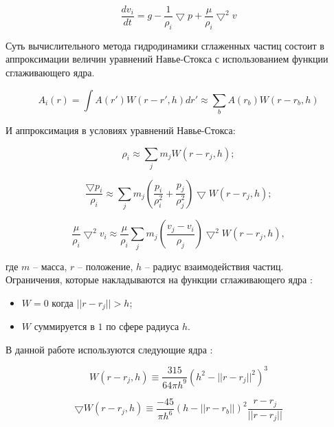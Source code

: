 \begin{equation}
\label{eq:}
\frac{dv_i}{dt} = g - \frac{1}{\rho_i}\bigtriangledown{}p + \frac{\mu}{\rho_i}\bigtriangledown^2v
\end{equation}

Суть вычислительного метода гидродинамики сглаженных частиц состоит в аппроксимации величин
уравнений Навье-Стокса с использованием функции сглаживающего ядра.

\begin{equation}
\label{eq:mon1992}
A_i(r) = \int{}A(r')W(r - r', h)dr' \approx \sum_{b}A(r_b)W(r - r_b, h)
\end{equation}

И аппроксимация в условиях уравнений Навье-Стокса:

\begin{equation}
\label{eq:}
  \rho_i \approx \sum_{j}m_jW(r - r_j, h);
\end{equation}

\begin{equation}
\label{eq:}
\frac{\bigtriangledown{}p_i}{\rho_i} \approx \sum_{j}m_j(\frac{p_i}{\rho_i^2} + \frac{p_j}{\rho_j^2})\bigtriangledown{}W(r - r_j, h);
\end{equation}

\begin{equation}
\label{eq:}
\frac{\mu}{\rho_i}\bigtriangledown^2v_i \approx \frac{\mu}{\rho_i}\sum_{j}m_j(\frac{v_j - v_i}{\rho_j})\bigtriangledown^2W(r - r_j, h),
\end{equation} 

где $m$ -- масса, $r$ -- положение, $h$ -- радиус взаимодействия частиц. \\

Ограничения, которые накладываются на функции сглаживающего ядра \cite{sphMon92}:

\begin{itemize}
  \item $W = 0$ когда $||r - r_j|| > h$;
  \item $W$ суммируется в $1$ по сфере радиуса $h$.
\end{itemize}

В данной работе используются следующие ядра \cite{sphMon92}:

\begin{equation}
\label{eq:}
W(r - r_j, h) \equiv \frac{315}{64\pi{}h^9}(h^2-||r-r_j||^2)^3
\end{equation}

\begin{equation}
\label{eq:}
\bigtriangledown{}W(r - r_j, h) \equiv \frac{-45}{\pi{}h^6}(h - ||r - r_b||)^2\frac{r - r_j}{||r - r_j||}
\end{equation}

